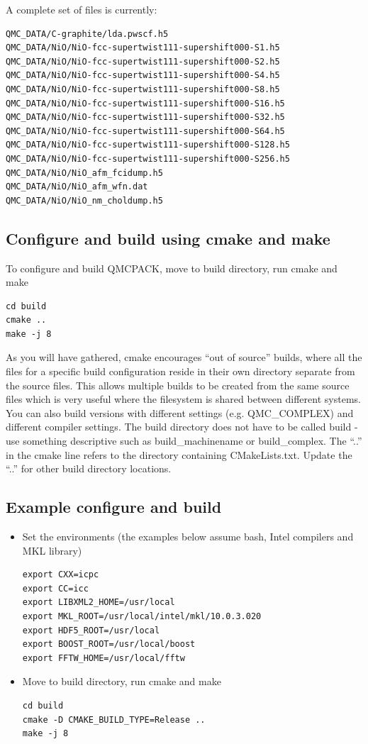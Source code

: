 A complete set of files is currently:
\verbatimfont{\footnotesize}%
\begin{verbatim}
QMC_DATA/C-graphite/lda.pwscf.h5
QMC_DATA/NiO/NiO-fcc-supertwist111-supershift000-S1.h5
QMC_DATA/NiO/NiO-fcc-supertwist111-supershift000-S2.h5
QMC_DATA/NiO/NiO-fcc-supertwist111-supershift000-S4.h5
QMC_DATA/NiO/NiO-fcc-supertwist111-supershift000-S8.h5
QMC_DATA/NiO/NiO-fcc-supertwist111-supershift000-S16.h5
QMC_DATA/NiO/NiO-fcc-supertwist111-supershift000-S32.h5
QMC_DATA/NiO/NiO-fcc-supertwist111-supershift000-S64.h5
QMC_DATA/NiO/NiO-fcc-supertwist111-supershift000-S128.h5
QMC_DATA/NiO/NiO-fcc-supertwist111-supershift000-S256.h5
QMC_DATA/NiO/NiO_afm_fcidump.h5
QMC_DATA/NiO/NiO_afm_wfn.dat
QMC_DATA/NiO/NiO_nm_choldump.h5
\end{verbatim}


\subsection{Configure and build using cmake and make}
To configure and build QMCPACK, move to build directory, run cmake and make
\verbatimfont{\footnotesize}
\begin{verbatim}
cd build
cmake ..
make -j 8
\end{verbatim}

As you will have gathered, cmake encourages ``out of source'' builds,
where all the files for a specific build configuration reside in their
own directory separate from the source files. This allows multiple
builds to be created from the same source files which is very useful
where the filesystem is shared between different systems. You can also
build versions with different settings (e.g. QMC\_COMPLEX) and
different compiler settings. The build directory does not have to be
called build - use something descriptive such as build\_machinename or
build\_complex. The ``..'' in the cmake line refers to the directory
containing CMakeLists.txt. Update the ``..'' for other build
directory locations.

\subsection{Example configure and build}
\begin{itemize}
\item Set the environments (the examples below assume bash, Intel compilers and MKL library)
\verbatimfont{\footnotesize}
\begin{verbatim}
export CXX=icpc
export CC=icc
export LIBXML2_HOME=/usr/local
export MKL_ROOT=/usr/local/intel/mkl/10.0.3.020
export HDF5_ROOT=/usr/local
export BOOST_ROOT=/usr/local/boost
export FFTW_HOME=/usr/local/fftw
\end{verbatim}

\item Move to build directory, run cmake and make
\verbatimfont{\footnotesize}
\begin{verbatim}
cd build
cmake -D CMAKE_BUILD_TYPE=Release ..
make -j 8
\end{verbatim}
\end{itemize}

